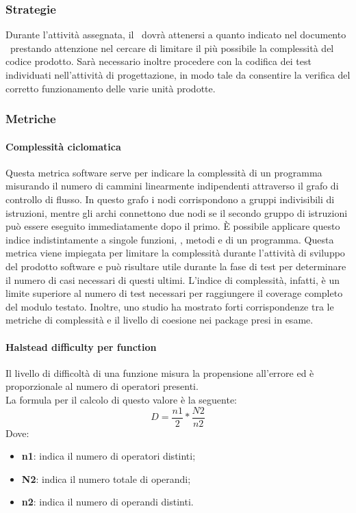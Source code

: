 \documentclass[../PianoDiQualifica.tex]{subfiles}
\begin{document}
			\subsubsection{Strategie}
			Durante l'attività assegnata, il \programmatore\ dovrà attenersi a quanto indicato nel documento \, prestando attenzione nel cercare di limitare il più possibile la complessità del codice prodotto. Sarà necessario inoltre procedere con la codifica dei test individuati nell'attività di progettazione, in modo tale da consentire la verifica del corretto funzionamento delle varie unità prodotte.
			\subsubsection{Metriche}
			\paragraph{Complessità ciclomatica}
			Questa metrica software serve per indicare la complessità di un programma misurando il numero di cammini linearmente indipendenti attraverso il grafo di controllo di flusso. In questo grafo i nodi corrispondono a gruppi indivisibili di istruzioni, mentre gli archi connettono due nodi se il secondo gruppo di istruzioni può essere eseguito immediatamente dopo il primo. È possibile applicare questo indice indistintamente a singole funzioni, , metodi e  di un programma. Questa metrica viene impiegata per limitare la complessità durante l'attività di sviluppo del prodotto software e può risultare utile durante la fase di test per determinare il numero di casi necessari di questi ultimi. L'indice di complessità, infatti, è un limite superiore al numero di test necessari per raggiungere il coverage completo del modulo testato. Inoltre, uno studio ha mostrato forti corrispondenze tra le metriche di complessità e il livello di coesione nei package presi in esame.\\
			
			\paragraph{Halstead difficulty per function}
				Il livello di difficoltà di una funzione misura la propensione all'errore ed è proporzionale al numero di operatori presenti.\\
				La formula per il calcolo di questo valore è la seguente:
				\begin{equation*}
					D = \frac{n1}{2} * \frac{N2}{n2}
				\end{equation*}
				Dove:
				\begin{itemize}
					\item \textbf{n1}: indica il numero di operatori distinti;
					\item \textbf{N2}: indica il numero totale di operandi;
					\item \textbf{n2}: indica il numero di operandi distinti.
				\end{itemize}
\end{document}

